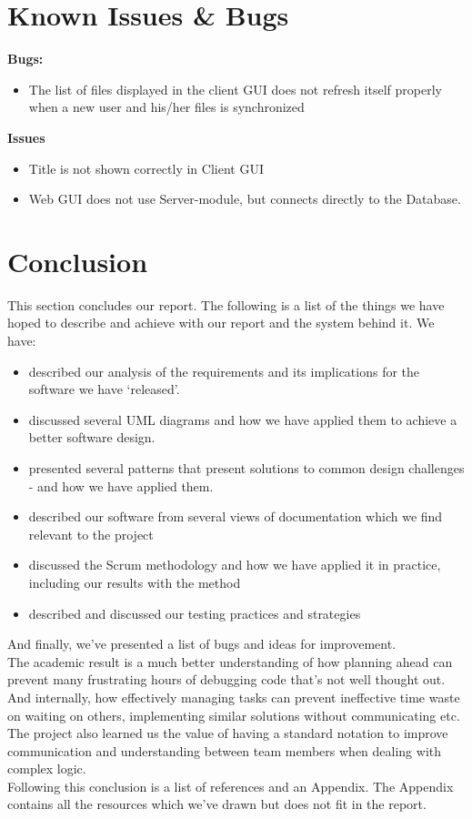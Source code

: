 \section{Known Issues \& Bugs}
\textbf{Bugs:}
\begin{itemize}
\item The list of files displayed in the client GUI does not refresh itself properly when a new user and his/her files is synchronized\\
\end{itemize}
\textbf{Issues}
\begin{itemize}
\item Title is not shown correctly in Client GUI
\item Web GUI does not use Server-module, but connects directly to the Database.
\end{itemize}
\section{Conclusion}
This section concludes our report. The following is a list of the things we have hoped to describe and achieve with our report and the system behind it. We have:
\begin{itemize}
\item described our analysis of the requirements and its implications for the software we have `released'. 
\item discussed several UML diagrams and how we have applied them to achieve a better software design. 
\item presented several patterns that present solutions to common design challenges - and how we have applied them. 
\item described our software from several views of documentation which we find relevant to the project
\item discussed the Scrum methodology and how we have applied it in practice, including our results with the method
\item described and discussed our testing practices and strategies
\end{itemize}
And finally, we've presented a list of bugs and ideas for improvement.\\
The academic result is a much better understanding of how planning ahead can prevent many frustrating hours of debugging code that's not well thought out. And internally, how effectively managing tasks can prevent ineffective time waste on waiting on others, implementing similar solutions without communicating etc. The project also learned us the value of having a standard notation to improve communication and understanding between team members when dealing with complex logic.\\
Following this conclusion is a list of references and an Appendix. The Appendix contains all the resources which we've drawn but does not fit in the report.\\
\newpage